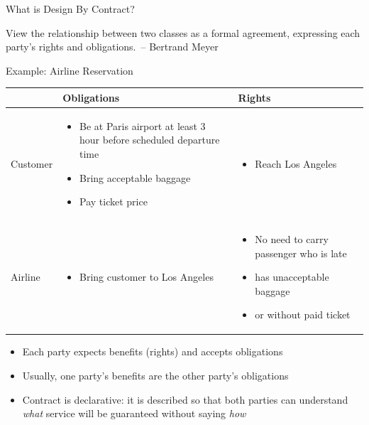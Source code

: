 \begin{frame}{What is Design By Contract?}
  \begin{boitequote}{}
    View the relationship between two classes as a formal agreement, expressing
    each party's rights and obligations.~\hfill{\rm -- Bertrand Meyer}
  \end{boitequote}

  \begin{block}{Example: Airline Reservation}
    \begin{tabular}{p{.15\linewidth}|p{.37\linewidth}|p{.37\linewidth}}\hline
      &Obligations&Rights\\\hline
      Customer&
      \begin{itemize}\vspace{-.8\baselineskip}
      \item Be at Paris airport at least 3 hour before scheduled departure time
      \item Bring acceptable baggage
      \item Pay ticket price
      \end{itemize}\vspace{-1.2\baselineskip}
      &
      \begin{itemize}\vspace{-.8\baselineskip}
      \item Reach Los Angeles
      \end{itemize}
      \\\hline
      Airline&
      \begin{itemize}\vspace{-.8\baselineskip}
      \item Bring customer to Los Angeles
      \end{itemize}
      &
      \begin{itemize}\vspace{-.8\baselineskip}
      \item No need to carry passenger who is late
      \item has unacceptable baggage
      \item or without paid ticket
      \end{itemize}\vspace{-1.2\baselineskip}
    \end{tabular}
  \end{block}
  \begin{itemize}
  \item Each party expects benefits (rights) and accepts obligations
  \item Usually, one party's benefits are the other party's obligations
  \item Contract is declarative: it is described so that both parties can
    understand \textit{what} service will be guaranteed without saying
    \textit{how}
  \end{itemize}
\end{frame}
